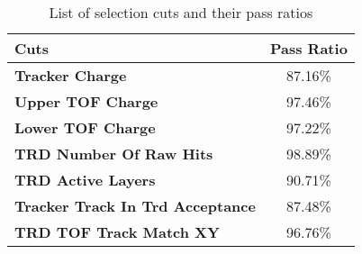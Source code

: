 \begin{table}[h]
\renewcommand\arraystretch{1.3}
\centering
\caption{List of selection cuts and their pass ratios}
\label{Quality cuts}
\begin{tabular}{lc}
\hline
Cuts & Pass Ratio \\
\hline
\textbf{Tracker Charge}                                           &   87.16\%    \\
\textbf{Upper TOF Charge}                                     &    97.46\%   \\
\textbf{Lower TOF Charge}                                     &    97.22\%   \\
\textbf{TRD Number Of Raw Hits}                          &    98.89\%   \\
\textbf{TRD Active Layers}                                      &    90.71\%   \\ 
\textbf{Tracker Track In Trd Acceptance}                &     87.48\%   \\
\textbf{TRD TOF Track Match XY}                          &     96.76\%   \\
\hline
\end{tabular}
\end{table}  

